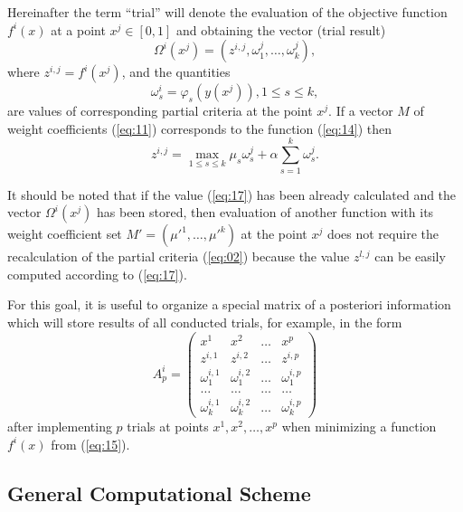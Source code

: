 \documentclass[runningheads]{llncs}
\begin{document}
Hereinafter the term ``trial'' will denote the evaluation of the objective function $f^i(x)$ at a point $x^j \in [0,1]$ and obtaining the vector (trial result)
\begin{equation}
    \label{eq:15a}
    \Omega^i(x^j)=(z^{i,j}, \omega^j_1, \dots, \omega^j_k),
\end{equation}
where $z^{i, j}=f^i(x^j)$, and the quantities
\begin{equation}
    \label{eq:16}
    \omega^i_s=\varphi_s(y(x^j)), 1 \leq s \leq k,
\end{equation}
are values of corresponding partial criteria at the point $x^j$. If a vector $M$ of weight coefficients (\ref{eq:11}) corresponds to the function (\ref{eq:14}) then 
\begin{equation}
    \label{eq:17}
    z^{i, j} = \max_{1\leq s \leq k} \mu_s \omega^j_s + \alpha \sum^k_{s=1} \omega^j_s.
\end{equation}

It should be noted that if the value (\ref{eq:17}) has been already calculated and the vector $\Omega^i(x^j)$ has been stored, then evaluation of another function with its weight coefficient set $M'=(\mu'^1, \dots, \mu'^k)$ at the point $x^j$ does not require the recalculation of the partial criteria (\ref{eq:02}) because the value $z^{l, j}$ can be easily computed according to (\ref{eq:17}).

For this goal, it is useful to organize a special matrix of a posteriori information which will store results of all conducted trials, for example, in the form
\begin{equation}
    \label{eq:18}
A^i_p =
\begin{pmatrix}
x^1 & x^2 & \dots & x^p \\
z^{i,1} & z^{i,2} & \dots & z^{i,p} \\
\omega_1^{i,1} & \omega_1^{i,2} & \dots & \omega_1^{i,p} \\
\dots & \dots & \dots & \dots \\
\omega_k^{i,1} & \omega_k^{i,2} & \dots & \omega_k^{i,p}
\end{pmatrix}
\end{equation}
after implementing $p$ trials at points $x^1, x^2, \dots, x^p$ when minimizing a function $f^i(x)$ from (\ref{eq:15}).

\subsection{General Computational Scheme}
\end{document}

